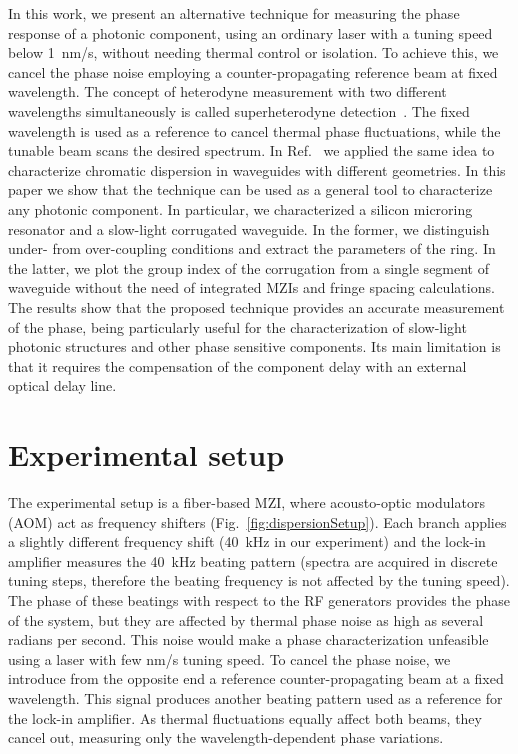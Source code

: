 \documentclass[journal]{IEEEtran}
\begin{document}
In this work, we present an alternative technique for measuring the phase response of a photonic component, using an ordinary laser with a tuning speed below 1~nm/s, without needing thermal control or isolation.
To achieve this, we cancel the phase noise employing a counter-propagating reference beam at fixed wavelength.
The concept of heterodyne measurement with two different wavelengths simultaneously is called superheterodyne detection~\cite{Dandliker1988}.
The fixed wavelength is used as a reference to cancel thermal phase fluctuations, while the tunable beam scans the desired spectrum.
In Ref.~\cite{Mas2012} we applied the same idea to characterize chromatic dispersion in waveguides with different geometries.
In this paper we show that the technique can be used as a general tool to characterize any photonic component.
In particular, we characterized a silicon microring resonator and a slow-light corrugated waveguide.
In the former, we distinguish under- from over-coupling conditions and extract the parameters of the ring.
In the latter, we plot the group index of the corrugation from a single segment of waveguide without the need of integrated MZIs and fringe spacing calculations.
The results show that the proposed technique provides an accurate measurement of the phase, being particularly useful for the characterization of slow-light photonic structures and other phase sensitive components.
Its main limitation is that it requires the compensation of the component delay with an external optical delay line.


\section{Experimental setup}
The experimental setup is a fiber-based MZI, where acousto-optic modulators (AOM) act as frequency shifters (Fig.~\ref{fig:dispersionSetup}).
Each branch applies a slightly different frequency shift (40~kHz in our experiment) and the lock-in amplifier measures the 40~kHz beating pattern (spectra are acquired in discrete tuning steps, therefore the beating frequency is not affected by the tuning speed).
The phase of these beatings with respect to the RF generators provides the phase of the system, but they are affected by thermal phase noise as high as several radians per second. 
This noise would make a phase characterization unfeasible using a laser with few nm/s tuning speed.
To cancel the phase noise, we introduce from the opposite end a reference counter-propagating beam at a fixed wavelength.
This signal produces another beating pattern used as a reference for the lock-in amplifier.
As thermal fluctuations equally affect both beams, they cancel out, measuring only the wavelength-dependent phase variations.
\end{document}
